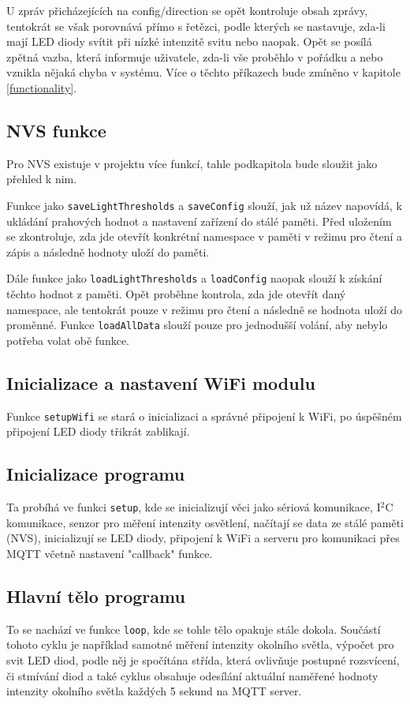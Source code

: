 \documentclass[a4paper, 11pt, hidelinks]{article}
\begin{document}
U zpráv přicházejících na config/direction se opět kontroluje obsah zprávy, tentokrát se však porovnává přímo s řetězci, podle kterých se nastavuje, zda-li mají LED diody svítit při nízké intenzitě svitu nebo naopak. Opět se posílá zpětná vazba, která informuje uživatele, zda-li vše proběhlo v pořádku a nebo vznikla nějaká chyba v systému. Více o těchto příkazech bude zmíněno v kapitole \ref{functionality}.

\subsection{NVS funkce}
Pro NVS existuje v projektu více funkcí, tahle podkapitola bude sloužit jako přehled k nim. 

Funkce jako \texttt{saveLightThresholds} a \texttt{saveConfig} slouží, jak už název napovídá, k ukládání prahových hodnot a nastavení zařízení do stálé paměti. Před uložením se zkontroluje, zda jde otevřít konkrétní namespace v paměti v režimu pro čtení a zápis a následně hodnoty uloží do paměti.

Dále funkce jako \texttt{loadLightThresholds} a \texttt{loadConfig} naopak slouží k získání těchto hodnot z paměti. Opět proběhne kontrola, zda jde otevřít daný namespace, ale tentokrát pouze v režimu pro čtení a následně se hodnota uloží do proměnné. Funkce \texttt{loadAllData} slouží pouze pro jednodušší volání, aby nebylo potřeba volat obě funkce.

\newpage

\subsection{Inicializace a nastavení WiFi modulu}
Funkce \texttt{setupWifi} se stará o inicializaci a správné připojení k WiFi, po úspěšném připojení LED diody třikrát zablikají.

\subsection{Inicializace programu}
Ta probíhá ve funkci \texttt{setup}, kde se inicializují věci jako sériová komunikace, I$^2$C komunikace, senzor pro měření intenzity osvětlení, načítají se data ze stálé paměti (NVS), inicializují se LED diody, připojení k WiFi a serveru pro komunikaci přes MQTT včetně nastavení "callback" funkce.

\subsection{Hlavní tělo programu}
To se nachází ve funkce \texttt{loop}, kde se tohle tělo opakuje stále dokola. Součástí tohoto cyklu je například samotné měření intenzity okolního světla, výpočet pro svit LED diod, podle něj je spočítána střída, která ovlivňuje postupné rozsvícení, či stmívání diod a také cyklus obsahuje odesílání aktuální naměřené hodnoty intenzity okolního světla každých 5 sekund na MQTT server.
\end{document}
